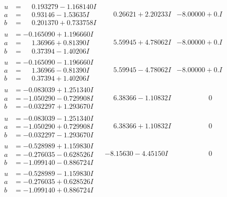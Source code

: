 \documentclass[1p]{elsarticle_modified}
\theoremstyle{definition}
\begin{document}
$$\begin{array}{c|c|c}
\begin{aligned}
u &= \phantom{-}0.193279 - 1.168140 I \\
a &= \phantom{-}0.93146 - 1.53635 I \\
b &= \phantom{-}0.201370 + 0.733758 I\end{aligned}
 & \phantom{-}0.26621 + 2.20233 I & -8.00000 + 0. I\phantom{ +0.000000I} \\ \hline\begin{aligned}
u &= -0.165090 + 1.196660 I \\
a &= \phantom{-}1.36966 + 0.81390 I \\
b &= \phantom{-}0.37394 - 1.40206 I\end{aligned}
 & \phantom{-}5.59945 + 4.78062 I & -8.00000 + 0. I\phantom{ +0.000000I} \\ \hline\begin{aligned}
u &= -0.165090 - 1.196660 I \\
a &= \phantom{-}1.36966 - 0.81390 I \\
b &= \phantom{-}0.37394 + 1.40206 I\end{aligned}
 & \phantom{-}5.59945 - 4.78062 I & -8.00000 + 0. I\phantom{ +0.000000I} \\ \hline\begin{aligned}
u &= -0.083039 + 1.251340 I \\
a &= -1.050290 - 0.729908 I \\
b &= -0.032297 + 1.293670 I\end{aligned}
 & \phantom{-}6.38366 - 1.10832 I & \phantom{-0.000000 } 0 \\ \hline\begin{aligned}
u &= -0.083039 - 1.251340 I \\
a &= -1.050290 + 0.729908 I \\
b &= -0.032297 - 1.293670 I\end{aligned}
 & \phantom{-}6.38366 + 1.10832 I & \phantom{-0.000000 } 0 \\ \hline\begin{aligned}
u &= -0.528989 + 1.159830 I \\
a &= -0.276035 - 0.628526 I \\
b &= -1.099140 - 0.886724 I\end{aligned}
 & -8.15630 - 4.45150 I & \phantom{-0.000000 } 0 \\ \hline\begin{aligned}
u &= -0.528989 - 1.159830 I \\
a &= -0.276035 + 0.628526 I \\
b &= -1.099140 + 0.886724 I\end{aligned}

\end{array}$$
\end{document}
